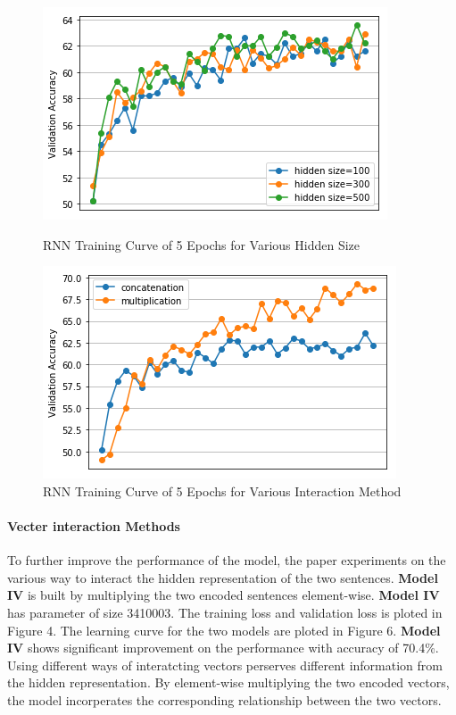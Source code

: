 \documentclass[10pt]{article}
\begin{document}
\begin{figure}[]
\centering
\begin{minipage}{.4\textwidth}
  \includegraphics[width=\textwidth]{plot1}
  \caption{RNN Training Curve of 5 Epochs for Various Hidden Size}
\end{minipage}%
\hfill
\begin{minipage}{.4\textwidth}
  \includegraphics[width=\textwidth]{plot2}
  \caption{RNN Training Curve of 5 Epochs for Various Interaction Method}
\end{minipage}
\end{figure}

\paragraph{Vecter interaction Methods}
To further improve the performance of the model, the  paper experiments on the various way to interact the hidden representation of the two sentences. \textbf{Model IV} is built by multiplying the two encoded sentences element-wise. \textbf{Model IV} has parameter of size 3410003. The training loss and validation loss is ploted in Figure 4. The learning curve for the two models are ploted in Figure 6. \textbf{Model IV} shows significant improvement on the performance with accuracy of 70.4\%. Using different ways of interatcting vectors perserves different information from the hidden representation. By element-wise multiplying the two encoded vectors, the model incorperates the corresponding relationship between the two vectors. 
\end{document}
